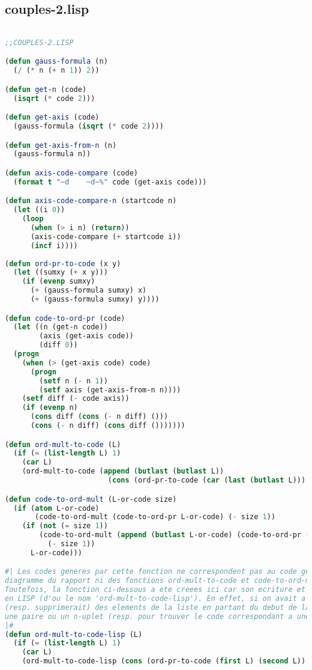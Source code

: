 \documentclass{article}
\begin{document}
\subsection{couples-2.lisp}
\label{couples2lisp}
\begin{lstlisting}[language=Lisp, basicstyle=\footnotesize]

;;COUPLES-2.LISP

(defun gauss-formula (n)
  (/ (* n (+ n 1)) 2))

(defun get-n (code)
  (isqrt (* code 2)))

(defun get-axis (code)
  (gauss-formula (isqrt (* code 2))))

(defun get-axis-from-n (n)
  (gauss-formula n))

(defun axis-code-compare (code)
  (format t "~d    ~d~%" code (get-axis code))) 

(defun axis-code-compare-n (startcode n)
  (let ((i 0))
    (loop
      (when (> i n) (return))
      (axis-code-compare (+ startcode i))
      (incf i))))
  
(defun ord-pr-to-code (x y)
  (let ((sumxy (+ x y)))
    (if (evenp sumxy)
      (+ (gauss-formula sumxy) x)
      (+ (gauss-formula sumxy) y))))

(defun code-to-ord-pr (code)
  (let ((n (get-n code))
        (axis (get-axis code))
        (diff 0))
  (progn
    (when (> (get-axis code) code)
      (progn
        (setf n (- n 1))
        (setf axis (get-axis-from-n n))))
    (setf diff (- code axis))
    (if (evenp n)
      (cons diff (cons (- n diff) ()))
      (cons (- n diff) (cons diff ()))))))

(defun ord-mult-to-code (L)
  (if (= (list-length L) 1)
    (car L)
    (ord-mult-to-code (append (butlast (butlast L)) 
                        (cons (ord-pr-to-code (car (last (butlast L))) (car (last L))) ())))))

(defun code-to-ord-mult (L-or-code size)
  (if (atom L-or-code)
       (code-to-ord-mult (code-to-ord-pr L-or-code) (- size 1))
    (if (not (= size 1))
        (code-to-ord-mult (append (butlast L-or-code) (code-to-ord-pr (car (last L-or-code))))
          (- size 1))
      L-or-code)))

#| Les codes generes par cette fonction ne correspondent pas au code genere par le
diagramme du rapport ni des fonctions ord-mult-to-code et code-to-ord-mult. 
Toutefois, la fonction ci-dessous a ete creees ici car son ecriture et beaucoup plus idiomatique
en LISP (d'ou le nom 'ord-mult-to-code-lisp'). En effet, si on avait a coder les nombres naturels en LISP, on ajouterait 
(resp. supprimerait) des elements de la liste en partant du debut de la liste afin de creer
une paire ou un n-uplet (resp. pour trouver le code correspondant a une paire ou un n-uplet
|#
(defun ord-mult-to-code-lisp (L)
  (if (= (list-length L) 1)
    (car L)
    (ord-mult-to-code-lisp (cons (ord-pr-to-code (first L) (second L)) (cddr L)))))


\end{lstlisting}
\end{document}
